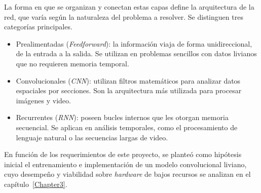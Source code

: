 La forma en que se organizan y conectan estas capas define la arquitectura de la red, que varía según la naturaleza del problema a resolver. Se distinguen tres categorías principales.

\begin{itemize}

\item Prealimentadas (\emph{Feedforward}): la información viaja de forma unidireccional, de la entrada a la salida. Se utilizan en problemas sencillos con datos livianos que no requieren memoria temporal.

\item Convolucionales (\emph{CNN}): utilizan filtros matemáticos para analizar datos espaciales por secciones. Son la arquitectura más utilizada para procesar imágenes y video.

\item Recurrentes (\emph{RNN}): poseen bucles internos que les otorgan memoria secuencial. Se aplican en análisis temporales, como el procesamiento de lenguaje natural o las secuencias largas de video.

\end{itemize}

En función de los requerimientos de este proyecto, se planteó como hipótesis inicial el entrenamiento e implementación de un modelo convolucional liviano, cuyo desempeño y viabilidad sobre \emph{hardware} de bajos recursos se analizan en el capítulo~\ref{Chapter3}.


